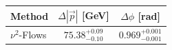     \begin{tabular}{lcc}
        \toprule
        Method & $\Delta |\vec p|$ [GeV] & $\Delta \phi$ [rad] \\
        \midrule
        $\nu^2$-Flows & $75.38_{-0.10}^{+0.09}$ & $0.969_{-0.001}^{+0.001}$ \\
        \bottomrule
    \end{tabular}